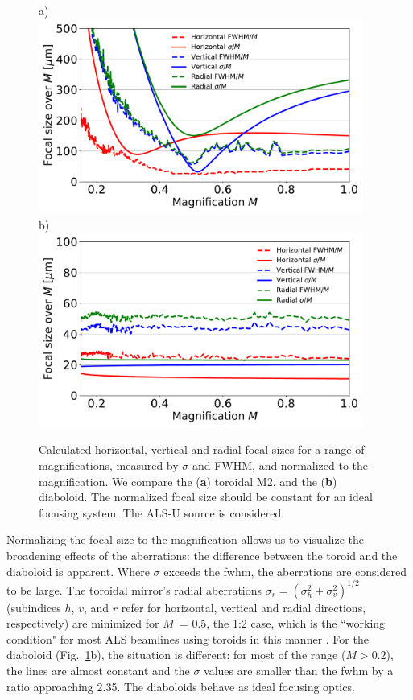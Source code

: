 \documentclass[preprint]{iucr}       %
\newcommand{\inred}[1]{{\color{red}#1}}
\begin{document}
\begin{figure}\label{fig:scan}
\flushleft
a)\\
\centering
\includegraphics[width=0.95\textwidth]{figures/scan_toroid.pdf}\\
\flushleft
b)\\
\centering
\includegraphics[width=0.95\textwidth]{figures/scan_diaboloid.pdf}\\
\caption{Calculated horizontal, vertical and radial focal sizes for a range of magnifications, measured by $\sigma$ and FWHM, and normalized to the magnification. We compare the (\textbf{a}) toroidal M2, and the (\textbf{b}) diaboloid. The normalized focal size should be constant for an ideal focusing system. \inred{The ALS-U source is considered.}}
\end{figure}

Normalizing the focal size to the magnification allows us to visualize \inred{the} broadening effects of the aberrations: the difference between the toroid and the diaboloid is apparent. Where $\sigma$ exceeds the fwhm, the aberrations are considered to be large. The toroidal mirror's radial aberrations $\sigma_r = (\sigma_h^2 + \sigma_v^2)^{1/2}$ (subindices $h$, $v$, and $r$ refer for horizontal, vertical and radial directions, respectively) are minimized for $M$~= 0.5, the 1:2 case, which is the ``working condition" for most ALS beamlines using toroids in this manner \cite{MacDowell2004}. For the diaboloid (Fig.~\ref{fig:scan}b), the situation is different: for most of the range ($M > 0.2$), the lines are almost constant and the $\sigma$ values are smaller than the fwhm by a ratio approaching 2.35. The diaboloids behave as ideal focusing optics.
\end{document}
